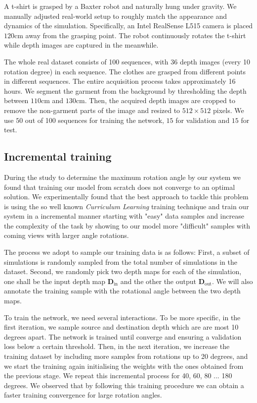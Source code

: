 \vspace{1mm}
 A t-shirt is grasped by a Baxter robot and naturally hung under gravity. 
We manually adjusted real-world setup to roughly match the appearance and dynamics of the simulation. Specifically, an Intel RealSense L515 camera is placed $120$cm away from the grasping point. The robot continuously rotates the t-shirt while depth images are captured in the meanwhile.

The whole real dataset consists of 100 sequences, with 36 depth images (every 10 rotation degree) in each sequence. 
The clothes are grasped from different points in different sequences. The entire acquisition process takes approximately 16 hours. We segment the garment from the background by thresholding the depth between $110$cm and $130$cm. Then, the acquired depth images are cropped to remove the non-garment parts of the image and resized to $512\times512$ pixels.
We use $50$ out of 100 sequences for training the network, $15$ for validation and $15$ for test.


\subsection{Incremental training}

During the study to determine the maximum rotation angle by our system we found that training our model from scratch does not converge to an optimal solution. We experimentally found that the best approach to tackle this problem is using the so well known \textit{Curriculum Learning} training technique and train our system in a incremental manner starting with "easy" data samples and increase the complexity of the task by showing to our model more "difficult" samples with coming views with larger angle rotations.

The process we adopt to sample our training data is as follows: First, a subset of simulations is randomly sampled from the total number of  simulations in the dataset. Second, we randomly pick two depth maps for each of the simulation, one shall be the input depth map $\mathbf{D}_{\textrm{in}}$ and the other the output $\mathbf{D}_{\textrm{out}}$. We will also annotate the training sample with  the rotational angle between the two depth maps.

To train the network, we need several interactions. To be more specific, in the first iteration, we sample source and destination depth which are are most 10 degrees apart.  The network is trained until converge and ensuring a validation loss below a certain threshold.  Then, in the next iteration, we increase the training dataset by including more samples from rotations up to 20 degrees, and we start the training again initialising the weights with the ones obtained from the previous stage. We repeat this incremental process for 40, 60, 80 ... 180 degrees. We observed that by following this training procedure we can obtain a faster training convergence for large rotation angles.   

